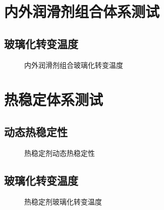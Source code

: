 \documentclass[a4paper, oneside, onecolumn, 12pt]{ctexrep}    %
\begin{document}
\section{内外润滑剂组合体系测试}

\subsection{玻璃化转变温度}
\begin{figure}[H]
    \begin{center}
        
    \end{center}
    \caption{内外润滑剂组合玻璃化转变温度}
\end{figure}

\section{热稳定体系测试}

\subsection{动态热稳定性}
\begin{figure}[H]
    \begin{center}
        
    \end{center}
    \caption{热稳定剂动态热稳定性}
\end{figure}

\subsection{玻璃化转变温度}
\begin{figure}[H]
    \begin{center}
        
    \end{center}
    \caption{热稳定剂玻璃化转变温度}
\end{figure}

\clearpage
{}


\end{document}
